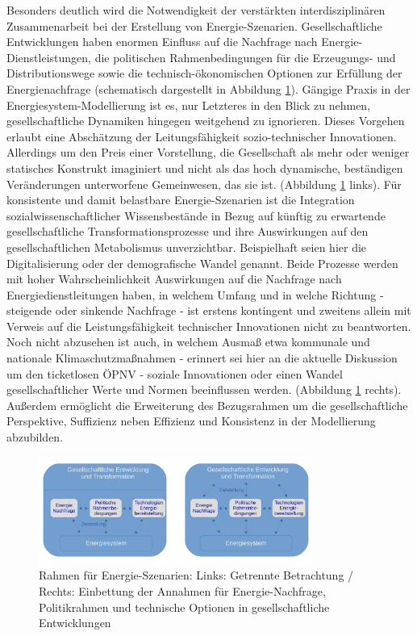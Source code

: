 \documentclass[a4paper,11pt,twoside]{scrartcl}
\begin{document}
Besonders deutlich wird die Notwendigkeit der verstärkten interdisziplinären Zusammenarbeit bei der Erstellung von Energie-Szenarien. Gesellschaftliche Entwicklungen haben enormen Einfluss auf die Nachfrage nach Energie-Dienstleistungen, die politischen Rahmenbedingungen für die Erzeugungs- und Distributionswege sowie die technisch-ökonomischen Optionen zur Erfüllung der Energienachfrage (schematisch dargestellt in Abbildung \ref{fig:szenarien}). Gängige Praxis in der Energiesystem-Modellierung ist es, nur Letzteres in den Blick zu nehmen, gesellschaftliche Dynamiken hingegen weitgehend zu ignorieren.  Dieses Vorgehen erlaubt eine Abschätzung der Leitungsfähigkeit sozio-technischer Innovationen. Allerdings um den Preis einer Vorstellung, die Gesellschaft als mehr oder weniger statisches Konstrukt imaginiert und nicht als das hoch dynamische, beständigen Veränderungen unterworfene Gemeinwesen, das sie ist.   (Abbildung \ref{fig:szenarien} links). Für konsistente und damit belastbare Energie-Szenarien ist die Integration sozialwissenschaftlicher Wissensbestände in Bezug auf künftig zu erwartende gesellschaftliche Transformationsprozesse und ihre Auswirkungen auf den gesellschaftlichen Metabolismus unverzichtbar. Beispielhaft seien hier die Digitalisierung oder der demografische Wandel genannt. Beide Prozesse werden mit hoher Wahrscheinlichkeit Auswirkungen auf die Nachfrage nach Energiedienstleitungen haben, in welchem Umfang und in welche Richtung - steigende oder sinkende Nachfrage - ist erstens kontingent und zweitens allein mit Verweis auf die Leistungsfähigkeit technischer Innovationen nicht zu beantworten. Noch nicht abzusehen ist auch, in welchem Ausmaß etwa kommunale und nationale Klimaschutzmaßnahmen - erinnert sei hier an die aktuelle Diskussion um den ticketlosen ÖPNV - soziale Innovationen oder einen Wandel gesellschaftlicher Werte und Normen beeinflussen werden. (Abbildung \ref{fig:szenarien} rechts). Außerdem ermöglicht die Erweiterung des Bezugsrahmen um die gesellschaftliche Perspektive, Suffizienz neben Effizienz und Konsistenz in der Modellierung abzubilden. 

\begin{figure}[!h]
    \centering
    \includegraphics[width=0.8\textwidth]{figures/Szenarien.pdf}
    \caption{Rahmen für Energie-Szenarien: Links: Getrennte Betrachtung / Rechts: Einbettung der Annahmen für Energie-Nachfrage, Politikrahmen und technische Optionen in gesellschaftliche Entwicklungen}
    \label{fig:szenarien}
\end{figure}
\end{document}
